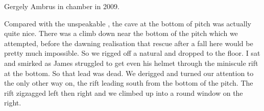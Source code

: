 \begin{marginfigure}
\checkoddpage \ifoddpage \forcerectofloat \else \forceversofloat \fi
\centering
 \caption{Gergely Ambrus in \protect{} chamber in 2009. }
 \label{intravenus chamber}
\end{marginfigure}

Compared with the unspeakable , the cave at the bottom of
 pitch was actually quite nice. There was a climb down
near the bottom of the pitch which we attempted, before the dawning
realisation that rescue after a fall here would be pretty much
impossible. So we rigged off a natural and dropped to the floor. I sat
and smirked as James struggled to get even his helmet through the
miniscule rift at the bottom. So that lead was dead. We derigged and
turned our attention to the only other way on, the rift leading south
from the bottom of the pitch. The rift zigzagged left then right and we
climbed up into a round window on the right.

